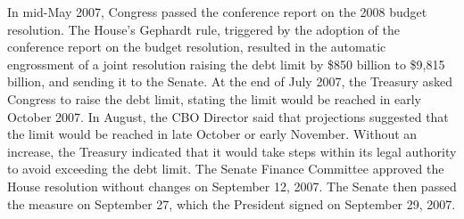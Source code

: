 In mid-May 2007, Congress passed the conference report on the 2008 budget resolution. The House’s Gephardt rule, triggered by the adoption of the conference report on the budget resolution, resulted in the automatic engrossment of a joint resolution raising the debt limit by \$850 billion to \$9,815 billion, and sending it to the Senate. At the end of July 2007, the Treasury asked Congress to raise the debt limit, stating the limit would be reached in early October 2007. In August, the CBO Director said that projections suggested that the limit would be reached in late October or early November. Without an increase, the Treasury indicated that it would take steps within its legal authority to avoid exceeding the debt limit. The Senate Finance Committee approved the House resolution without changes on September 12, 2007. The Senate then passed the measure on September 27, which the President signed on September 29, 2007.

